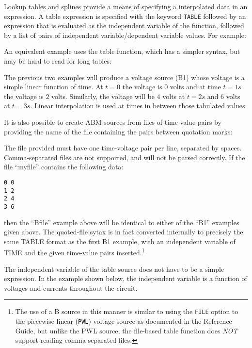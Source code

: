 Lookup tables and splines provide a means of
specifying a interpolated data in an expression.  A table expression is
specified with the keyword \verb+TABLE+ followed by an expression that
is evaluated as the independent variable of the function, followed by a
list of pairs of independent variable/dependent variable values.  For
example:


An equivalent example uses the table function, which has a simpler syntax, but
 may be hard to read for long tables:


The previous two examples will produce a voltage source (B1) whose voltage
is a simple linear function of time.  At $t=0$ the voltage is $0$ volts and 
at time $t=1s$ the voltage is $2$ volts.  Similarly, the voltage will
be $4$ volts at $t=2s$ and $6$ volts at $t=3s$. Linear interpolation is
used at times in between those tabulated values.

It is also possible to create ABM sources from files of time-value pairs by providing the name of the file containing the pairs between quotation marks:


The file provided must have one time-voltage pair per line, separated
by spaces.  Comma-separated files are not supported, and will not be
parsed correctly.  If the file ``myfile'' contains the following data:
\begin{verbatim}
0 0
1 2
2 4
3 6
\end{verbatim}
then the ``Bfile'' example above will be identical to either of the
``B1'' examples given above.  The quoted-file sytax is in fact converted
internally to precisely the same TABLE format as the first B1 example,
with an independent variable of TIME and the given time-value pairs
inserted.\footnote{The use of a B source in this manner is similar to using the \texttt{FILE} option to the piecewise linear (\texttt{PWL}) voltage source as documented in the \Xyce{} Reference Guide\ReferenceGuide, but unlike the PWL source, the file-based table function does {\em NOT\/} support reading comma-separated files.}

The independent variable of the table source does not have to be a
simple expression.  In the example shown below, the independent variable is
a function of voltages and currents throughout the circuit.

